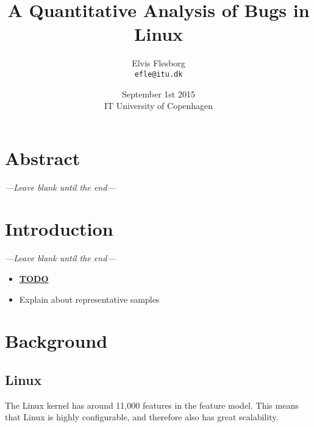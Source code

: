\documentclass[a4paper,11pt]{article}
\begin{document}
\setlength{\parindent}{0cm}
\setlength{\unitlength}{1mm}

\date{September 1st 2015\\ IT University of Copenhagen}
\title{A Quantitative Analysis of Bugs in Linux}
\author{Elvis Flesborg\\
\texttt{efle@itu.dk}}
\clearpage\maketitle
\thispagestyle{empty}
\newpage

\tableofcontents
\thispagestyle{empty}



\newpage

\setcounter{page}{1}

\section{Abstract}
\emph{---Leave blank until the end---}

\section{Introduction}
\emph{---Leave blank until the end---}


\begin{itemize}
    \item \underline{\textbf{TODO}}
        \item Explain about representative samples
\end{itemize}


\newpage
\section{Background}

\subsection{Linux}

The Linux kernel has around 11,000 features in the feature model. This means that Linux is highly configurable, and therefore also has great scalability.
\end{document}
